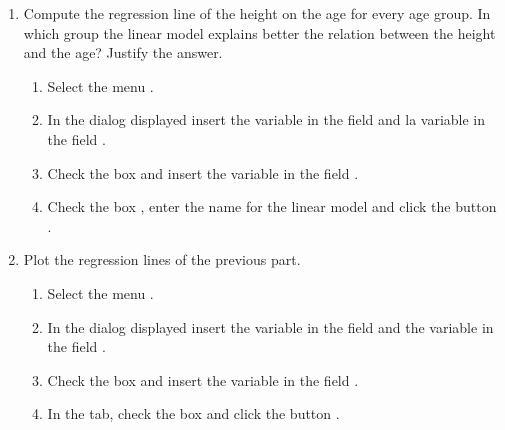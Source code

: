 \begin{enumerate}[leftmargin=*]
\begin{enumerate}
\item Compute the regression line of the height on the age for every age group.
In which group the linear model explains better the relation between the height and the age? 
Justify the answer.
\begin{indication}
\begin{enumerate}
\item Select the menu .
\item In the dialog displayed insert the variable  in the field  and la
variable  in the field .
\item Check the box  and insert the variable  in the field
.
\item Check the box , enter the name  for the linear
model and click the button .
\end{enumerate}
\end{indication}

\item Plot the regression lines of the previous part.
\begin{indication}
\begin{enumerate}
\item Select the menu .
\item In the dialog displayed insert the variable  in the field  and
the variable  in the field .
\item Check the box  and insert the variable  in the field
.
\item In the  tab, check the box  and click the button .
\end{enumerate}
\end{indication}


\end{enumerate}
\end{enumerate}
